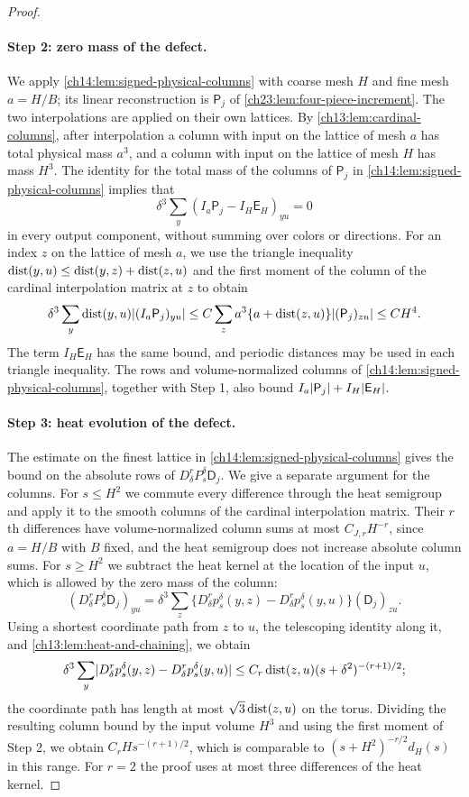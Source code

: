 \begin{proof}
\paragraph{Step 2: zero mass of the defect.}
We apply \cref{ch14:lem:signed-physical-columns} with coarse mesh $H$ and fine mesh $a=H/B$; its linear reconstruction is $\mathsf P_j$ of \cref{ch23:lem:four-piece-increment}. The two interpolations are applied on their own lattices. By \cref{ch13:lem:cardinal-columns}, after interpolation a column with input on the lattice of mesh $a$ has total physical mass $a^3$, and a column with input on the lattice of mesh $H$ has mass $H^3$. The identity for the total mass of the columns of $\mathsf P_j$ in \cref{ch14:lem:signed-physical-columns} implies that
\[
 \delta^3\sum_y(I_a\mathsf P_j-I_H\mathsf E_H)_{yu}=0
\]
in every output component, without summing over colors or directions. For an index $z$ on the lattice of mesh $a$, we use the triangle inequality $\operatorname{dist}(y,u)\le\operatorname{dist}(y,z)+\operatorname{dist}(z,u)$ and the first moment of the column of the cardinal interpolation matrix at $z$ to obtain
\[
 \delta^3\sum_y\operatorname{dist}(y,u)\lvert (I_a\mathsf P_j)_{yu}\rvert\le C\sum_za^3\{a+\operatorname{dist}(z,u)\}\lvert (\mathsf P_j)_{zu}\rvert\le CH^4.
\]
The term $I_H\mathsf E_H$ has the same bound, and periodic distances may be used in each triangle inequality. The rows and volume-normalized columns of \cref{ch14:lem:signed-physical-columns}, together with Step 1, also bound $I_a\lvert \mathsf P_j\rvert+I_H\lvert \mathsf E_H\rvert$.

\paragraph{Step 3: heat evolution of the defect.}
The estimate on the finest lattice in \cref{ch14:lem:signed-physical-columns} gives the bound on the absolute rows of $D_\delta^rP_s^\delta\mathsf D_j$. We give a separate argument for the columns. For $s\le H^2$ we commute every difference through the heat semigroup and apply it to the smooth columns of the cardinal interpolation matrix. Their $r$th differences have volume-normalized column sums at most $C_{J,r}H^{-r}$, since $a=H/B$ with $B$ fixed, and the heat semigroup does not increase absolute column sums. For $s\ge H^2$ we subtract the heat kernel at the location of the input $u$, which is allowed by the zero mass of the column:
\[
 (D_\delta^rP_s^\delta\mathsf D_j)_{yu}=\delta^3\sum_z\bigl\{D_\delta^rp_s^\delta(y,z)-D_\delta^rp_s^\delta(y,u)\bigr\}(\mathsf D_j)_{zu}.
\]
Using a shortest coordinate path from $z$ to $u$, the telescoping identity along it, and \cref{ch13:lem:heat-and-chaining}, we obtain
\[
 \delta^3\sum_y\lvert D_\delta^rp_s^\delta(y,z)-D_\delta^rp_s^\delta(y,u)\rvert\le C_r\operatorname{dist}(z,u)(s+\delta^2)^{-(r+1)/2};
\]
the coordinate path has length at most $\sqrt3\operatorname{dist}(z,u)$ on the torus. Dividing the resulting column bound by the input volume $H^3$ and using the first moment of Step 2, we obtain $C_rHs^{-(r+1)/2}$, which is comparable to $(s+H^2)^{-r/2}d_H(s)$ in this range. For $r=2$ the proof uses at most three differences of the heat kernel.


\end{proof}
